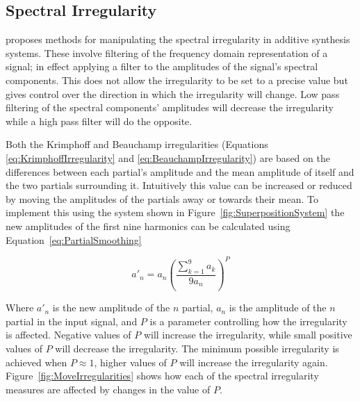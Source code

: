 	\subsection{Spectral Irregularity}
	\label{sec:FeatureControl-Parameterisation-Irregularity}
		\citet{beauchamp2007analysis} proposes methods for manipulating the spectral irregularity in additive
		synthesis systems. These involve filtering of the frequency domain representation of a signal; in effect
		applying a filter to the amplitudes of the signal's spectral components. This does not allow the
		irregularity to be set to a precise value but gives control over the direction in which the irregularity
		will change. Low pass filtering of the spectral components' amplitudes will decrease the irregularity while
		a high pass filter will do the opposite.
		
		Both the Krimphoff and Beauchamp irregularities (Equations \ref{eq:KrimphoffIrregularity} and
		\ref{eq:BeauchampIrregularity}) are based on the differences between each partial's amplitude and the mean
		amplitude of itself and the two partials surrounding it. Intuitively this value can be increased or reduced
		by moving the amplitudes of the partials away or towards their mean. To implement this using the system
		shown in Figure~\ref{fig:SuperpositionSystem} the new amplitudes of the first nine harmonics can be
		calculated using Equation~\ref{eq:PartialSmoothing}

		\begin{equation}
			a'_{n} = a_{n} \left( \frac{\sum_{k = 1}^{9} a_{k}}{9a_{n}} \right) ^{P}
			\label{eq:PartialSmoothing}
		\end{equation}

		Where $a'_{n}$ is the new amplitude of the $n$ partial, $a_{n}$ is the amplitude of the
		$n$ partial in the input signal, and $P$ is a parameter controlling how the irregularity is
		affected. Negative values of $P$ will increase the irregularity, while small positive values of $P$ will
		decrease the irregularity. The minimum possible irregularity is achieved when $P \approx 1$, higher values
		of $P$ will increase the irregularity again. Figure~\ref{fig:MoveIrregularities} shows how each of the
		spectral irregularity measures are affected by changes in the value of $P$.

